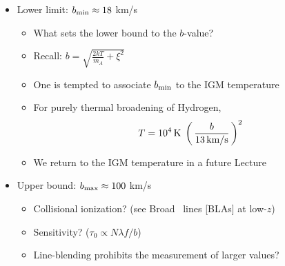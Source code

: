 \documentclass[12pt,letterpaper]{article}
\begin{document}
\begin{Aenumerate}
\begin{itemize}
	\item Lower limit: $b_{\rm min} \approx 18$ km/s
		\begin{itemize}
		\item What sets the lower bound to the $b$-value?
		\item Recall:  $b = \sqrt{\frac{2kT}{m_A} + \xi^2}$
		\item One is tempted to associate $b_{\rm min}$ to the IGM temperature
		\item For purely thermal broadening of Hydrogen, 
		\begin{equation}
		T = 10^4 \, {\rm K} \; \left ( \, \frac{b}{13 \, \rm km/s} \, \right )^2
		\end{equation}
		\item We return to the IGM temperature in a future Lecture
		\end{itemize}

	\item Upper bound: $b_{\rm max} \approx 100$ km/s
		\begin{itemize}
		\item Collisional ionization?  (see Broad \lya\ lines [BLAs] at low-$z$)
		\item Sensitivity? ($\tau_0 \propto N\lambda f / b$)
		\item Line-blending prohibits the measurement of larger values?
		\end{itemize}

	\end{itemize}


\end{Aenumerate}
\end{document}
